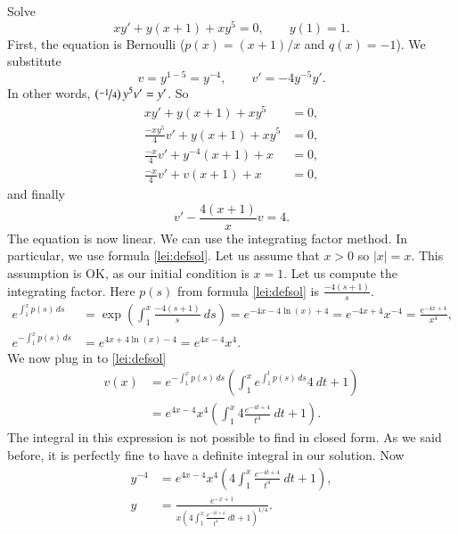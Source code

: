 \documentclass[12pt]{book}
\begin{document}
\begin{example}
Solve
\begin{equation*}
xy'+ y(x+1)+xy^5 = 0, \qquad y(1)=1 .
\end{equation*}
First, the equation is Bernoulli ($p(x) = (x+1)/x$ and $q(x) = -1$).
We substitute
\begin{equation*}
v=y^{1-5} = y^{-4}, \qquad
v' = -4 y^{-5} y' .
\end{equation*}
In other words, $\left( \nicefrac{-1}{4} \right) y^5 v' = y'$.  So
\begin{align*}
xy'+ y(x+1)+xy^5 & = 0 , \\
\frac{-xy^5}{4} v'+ y(x+1)+xy^5 & = 0 , \\
\frac{-x}{4} v'+ y^{-4}(x+1)+x & = 0 , \\
\frac{-x}{4} v'+ v(x+1)+x & = 0 ,
\end{align*}
and finally
\begin{equation*}
v'- \frac{4(x+1)}{x} v  = 4 .
\end{equation*}
The equation is now linear.
We can use the integrating factor method.  In particular, we
use formula \eqref{lei:defsol}.  Let us assume that $x > 0$
so $\lvert x \rvert = x$.  This assumption is OK, as our initial condition is
$x=1$.  Let us compute the integrating factor.  Here $p(s)$ from formula
\eqref{lei:defsol} is $\frac{-4(s+1)}{s}$.
\begin{align*}
e^{\int_1^x p(s)\,ds} & = \exp \left( \int_1^x \frac{-4(s+1)}{s} ~ds \right) =
e^{-4x-4\ln(x)+4} = 
e^{-4x+4} x^{-4}
=
\frac{e^{-4x+4}}{x^4} , \\
e^{-\int_1^x p(s)\,ds} & =
e^{4x+4\ln(x)-4} = 
e^{4x-4} x^4 .
\end{align*}
We now plug in to \eqref{lei:defsol}
\begin{equation*}
\begin{split}
v(x) & =
e^{-\int_{1}^x p(s)\, ds} \left( \int_{1}^x e^{\int_{1}^t p(s)\, ds} 4 ~dt
+ 1 \right) \\
& =
e^{4x-4} x^4
\left( \int_{1}^x 4 \frac{e^{-4t+4}}{t^4} ~dt
+ 1 \right) .
\end{split}
\end{equation*}
The integral in this expression is not possible to find in closed
form.  As we said before, it is perfectly fine to have a
definite integral in our solution.  Now 
\begin{align*}
 y^{-4} &= e^{4x-4}x^4 \left( 4 \int_1^x \frac{e^{-4t+4}}{t^4} ~dt + 1\right) , \\
 y &= \frac{e^{-x+1}}{x {\left( 4 \int_1^x \frac{e^{-4t+4}}{t^4} ~dt +
1\right)}^{1/4}} .
\end{align*}
\end{example}
\end{document}
